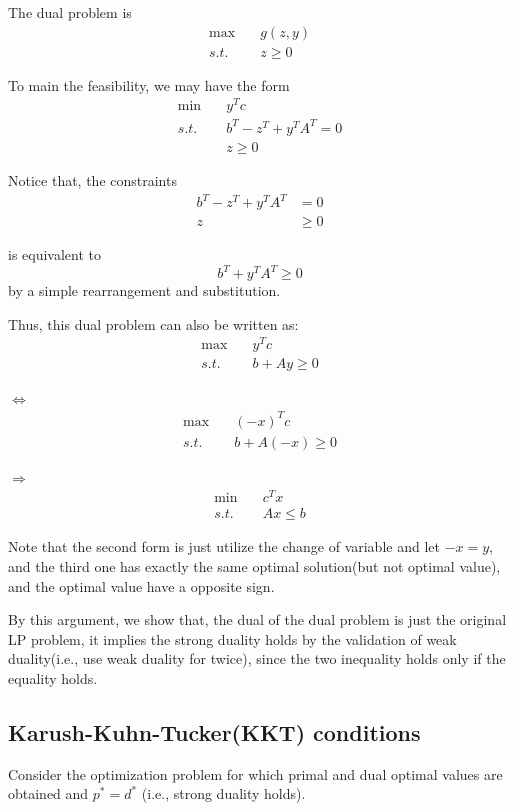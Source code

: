 The dual problem is
\begin{align*}
\max\quad &g(z,y)\\
s.t.\quad &z \geq 0
\end{align*}

To main the feasibility, we may have the form
\begin{align*}
\min\quad &y^Tc\\
s.t.\quad &b^T-z^T+y^TA^T=0\\
&z\geq 0
\end{align*}

Notice that, the constraints
\begin{align*}
b^T-z^T+y^TA^T&=0\\
z&\geq 0
\end{align*}

is equivalent to
$$b^T+y^TA^T \geq 0$$
by a simple rearrangement and substitution.


Thus, this dual problem can also be written as:
\begin{align*}
\max\quad &y^Tc\\
s.t.\quad &b+Ay \geq 0
\end{align*}

$\Leftrightarrow$
\begin{align*}
\max\quad &(-x)^Tc\\
s.t.\quad &b+A(-x) \geq 0
\end{align*}

$\Rightarrow$
\begin{align*}
\min\quad &c^Tx\\
s.t.\quad &Ax \leq b
\end{align*}

Note that the second form is just utilize the change of variable and let $-x=y$, and the third one has exactly the same optimal solution(but not optimal value), and the optimal value have a opposite sign.

By this argument, we show that, the dual of the dual problem is just the original LP problem, it implies the strong duality holds by the validation of weak duality(i.e., use weak duality for twice), since the two inequality holds only if the equality holds.


\subsection{Karush-Kuhn-Tucker(KKT) conditions}
Consider the optimization problem for which primal and dual optimal values are obtained and $p^*=d^*$ (i.e., strong duality holds).

